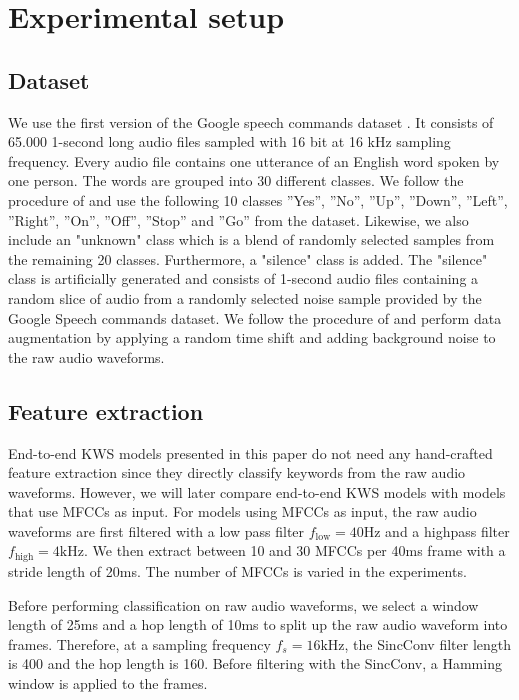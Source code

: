 \documentclass[a4paper]{article}
\begin{document}
\section{Experimental setup}
\label{sec:experimental_setup}

\subsection{Dataset}
We use the first version of the Google speech commands dataset \cite{Warden2018}. It consists of 65.000 1-second long audio files sampled with 16 bit at 16 kHz sampling frequency. Every audio file contains one utterance of an English word spoken by one person. The words are grouped into 30 different classes. We follow the procedure of \cite{Tang2017} and use the following 10 classes ”Yes”, ”No”, ”Up”, ”Down”, ”Left”, ”Right”, ”On”, ”Off”, ”Stop” and ”Go” from the dataset. Likewise, we also include an "unknown" class which is a blend of randomly selected samples from the remaining 20 classes. Furthermore, a "silence" class is added. The "silence" class is artificially generated and consists of 1-second audio files containing a random slice of audio from a randomly selected noise sample provided by the Google Speech commands dataset. We follow the procedure of \cite{Tang2017} and perform data augmentation by applying a random time shift and adding background noise to the raw audio waveforms.

\subsection{Feature extraction}
End-to-end KWS models presented in this paper do not need any hand-crafted feature extraction since they directly classify keywords from the raw audio waveforms. However, we will later compare end-to-end KWS models with models that use MFCCs as input. For models using MFCCs as input, the raw audio waveforms are first filtered with a low pass filter $f_{\mathrm{low}}=40 \mathrm{Hz}$ and a highpass filter $f_{\mathrm{high}}=4 \mathrm{kHz}$. We then extract between 10 and 30 MFCCs per 40ms frame with a stride length of 20ms. The number of MFCCs is varied in the experiments.

Before performing classification on raw audio waveforms, we select a window length of 25ms and a hop length of 10ms to split up the raw audio waveform into frames. Therefore, at a sampling frequency $f_s=16 \mathrm{kHz}$, the SincConv filter length is 400 and the hop length is 160. Before filtering with the SincConv, a Hamming window is applied to the frames.
\end{document}
